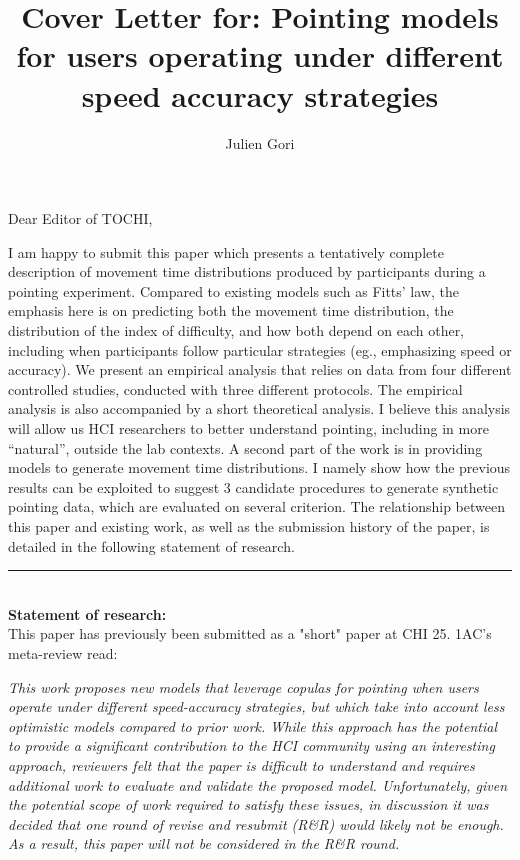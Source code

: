 \documentclass{article}
\title{Cover Letter for: Pointing models for users operating under different speed accuracy strategies}
\author{Julien Gori}
\begin{document}
\maketitle


Dear Editor of TOCHI, 

\vspace{2\baselineskip}


I am happy to submit this paper which presents a tentatively complete description of movement time distributions produced by participants during a pointing experiment. Compared to existing models such as Fitts' law, the emphasis here is on predicting both the movement time distribution, the distribution of the index of difficulty, and how both depend on each other, including when participants follow particular strategies (eg., emphasizing speed or accuracy). We present an empirical analysis that relies on data from four different controlled studies, conducted with three different protocols. The empirical analysis is also accompanied by a short theoretical analysis. I believe this analysis will allow us HCI researchers to better understand pointing, including in more ``natural'', outside the lab contexts.
A second part of the work is in providing models to generate movement time distributions. I namely show how the previous results can be exploited to suggest 3 candidate procedures to generate synthetic pointing data, which are evaluated on several criterion. 
The relationship between this paper and existing work, as well as the submission history of the paper, is detailed in the following statement of research.

\noindent\rule{\textwidth}{0.4pt}\\
\textbf{Statement of research:}\\
This paper has previously been submitted as a "short" paper at CHI 25. 1AC's meta-review read:


\textit{This work proposes new models that leverage copulas for pointing when users operate under different speed-accuracy strategies, but which take into account less optimistic models compared to prior work. While this approach has the potential to provide a significant contribution to the HCI community using an interesting approach, reviewers felt that the paper is difficult to understand and requires additional work to evaluate and validate the proposed model. Unfortunately, given the potential scope of work required to satisfy these issues, in discussion it was decided that one round of revise and resubmit (R\&R) would likely not be enough. As a result, this paper will not be considered in the R\&R round.}
\end{document}
